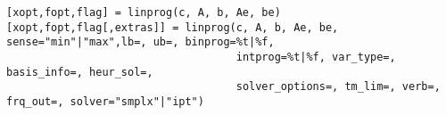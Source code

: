
\begin{mandesc}
\end{mandesc}

\begin{calling_sequence}
\begin{verbatim}
[xopt,fopt,flag] = linprog(c, A, b, Ae, be)
[xopt,fopt,flag[,extras]] = linprog(c, A, b, Ae, be, sense="min"|"max",lb=, ub=, binprog=%t|%f,
                                    intprog=%t|%f, var_type=, basis_info=, heur_sol=,
                                    solver_options=, tm_lim=, verb=, frq_out=, solver="smplx"|"ipt")
\end{verbatim}
\end{calling_sequence}
